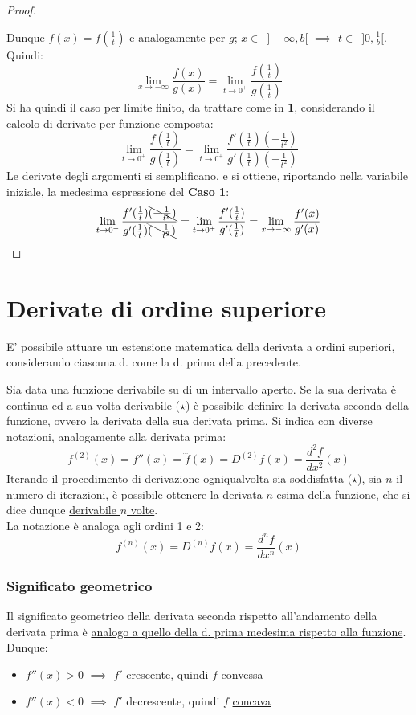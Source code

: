 \documentclass[10pt]{article}
\theoremstyle{plain}
\begin{document}
\begin{proof}
\begin{itemize}[label=$\circ$]
\end{itemize}
Dunque $f(x) = f(\frac{1}{t})$ e analogamente per $g$; $x \in \enspace ]- \infty, b[$ $\implies$ $t \in \enspace ]0, \frac{1}{b}[$. Quindi:
\[\lim \limits_{x \rightarrow - \infty} \frac{f(x)}{g(x)} = \lim \limits_{t \rightarrow 0^+} \frac{f(\frac{1}{t})}{g(\frac{1}{t})}\]
Si ha quindi il caso per limite finito, da trattare come in \textbf{1}, considerando il calcolo di derivate per funzione composta:
\[\lim \limits_{t \rightarrow 0^+} \frac{f(\frac{1}{t})}{g(\frac{1}{t})} = \lim \limits_{t \rightarrow 0^+} \frac{f'(\frac{1}{t}) (-\frac{1}{t^2})}{g'(\frac{1}{t}) (-\frac{1}{t^2})}\]
Le derivate degli argomenti si semplificano, e si ottiene, riportando nella variabile iniziale, la medesima espressione del \textbf{Caso 1}:
\[\lim \limits_{t \rightarrow 0^+} \frac{f'(\frac{1}{t}) \bcancel{(-\frac{1}{t^2})}}{g'(\frac{1}{t}) \bcancel{(-\frac{1}{t^2})}} = \lim \limits_{t \rightarrow 0^+} \frac{f'(\frac{1}{t})}{g'(\frac{1}{t})} = \lim \limits_{x \rightarrow - \infty} \frac{f'(x)}{g'(x)}\]
\end{proof}

\section{Derivate di ordine superiore}
E' possibile attuare un estensione matematica della derivata a ordini superiori, considerando ciascuna d. come la d. prima della precedente.
\begin{defin}
Sia data una funzione derivabile su di un intervallo aperto. Se la sua derivata è continua ed a sua volta derivabile ($\star$) è possibile definire la \underline{derivata seconda} della funzione, ovvero la derivata della sua derivata prima. 
Si indica con diverse notazioni, analogamente alla derivata prima:
\[f^{(2)}(x) = f''(x) = \dddot{f}(x) = D^{(2)}f(x) = \frac{d^2 f}{d x^2}(x)\]
Iterando il procedimento di derivazione ogniqualvolta sia soddisfatta ($\star$), sia $n$ il numero di iterazioni, è possibile ottenere la derivata $n$-esima della funzione, che si dice dunque \underline{derivabile $n$ volte}.\\
La notazione è analoga agli ordini 1 e 2:
\[f^{(n)}(x) = D^{(n)}f(x) = \frac{d^n f}{d x^n}(x)\]
\end{defin}

\subsubsection{Significato geometrico}
Il significato geometrico della derivata seconda rispetto all'andamento della derivata prima è \hyperlink{corlagrange}{analogo a quello della d. prima medesima rispetto alla funzione}. Dunque:
\begin{itemize}[label=$\square$]
    \item $f''(x) > 0$ $\implies$ $f'$ crescente, quindi $f$ \underline{convessa}
     \item $f''(x) < 0$ $\implies$ $f'$ decrescente, quindi $f$ \underline{concava}
\end{itemize}
\end{document}
